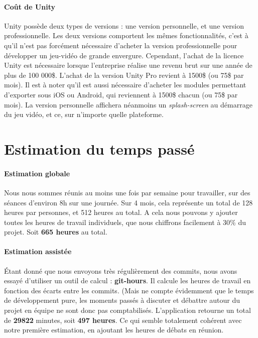 \paragraph{Coût de Unity}
Unity possède deux types de versions : une version personnelle, et une version professionnelle. Les deux versions comportent les mêmes fonctionnalités, c'est à qu'il n'est pas forcément nécessaire d'acheter la version professionnelle pour développer un jeu-vidéo de grande envergure. Cependant, l'achat de la licence Unity est nécessaire lorsque l'entreprise réalise une revenu brut sur une année de plus de 100 000\$. L'achat de la version Unity Pro revient à 1500\$ (ou 75\$ par mois). Il est à noter qu'il est aussi nécessaire d'acheter les modules permettant d'exporter sous iOS ou Android, qui reviennent à 1500\$ chacun (ou 75\$ par mois). La version personnelle affichera néanmoins un \textit{splash-screen} au démarrage du jeu vidéo, et ce, sur n'importe quelle plateforme.

\section{Estimation du temps passé}
 
\paragraph{Estimation globale}
Nous nous sommes réunis au moins une fois par semaine pour travailler, sur des séances d'environ 8h sur une journée. Sur 4 mois, cela représente un total de 128 heures par personnes, et 512 heures au total. A cela nous pouvons y ajouter toutes les heures de travail individuels, que nous chiffrons facilement à 30\% du projet. Soit \textbf{665 heures} au total.
 
\paragraph{Estimation assistée}
Étant donné que nous envoyons très régulièrement des commits, nous avons essayé d'utiliser un outil de calcul :  \textbf{git-hours}. Il calcule les heures de travail en fonction des écarts entre les commits. (Mais ne compte évidemment que le temps de développement pure, les moments passés à discuter et débattre autour du projet en équipe ne sont donc pas comptabilisés. L'application retourne un total de \textbf{29822} minutes, soit \textbf{497 heures}. Ce qui semble totalement cohérent avec notre première estimation, en ajoutant les heures de débats en réunion.
